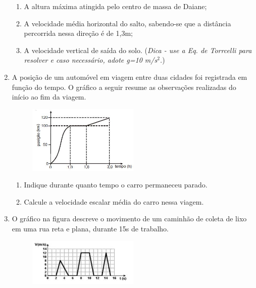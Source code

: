 \documentclass[12pt,letterpaper,fleqn]{article}
\begin{document}
\begin{enumerate}
    \begin{enumerate}
        \item A altura máxima atingida pelo centro de massa de Daiane;
        \item A velocidade média horizontal do salto, sabendo-se que a distância percorrida nessa direção é de 1,3m;
        \item A velocidade vertical de saída do solo. (\textit{Dica - use a Eq. de Torrcelli para resolver e caso necessário, adote g=10 m/s$^2$.})
    \end{enumerate}
    
    \item A posição de um automóvel em viagem entre duas cidades foi registrada em função do tempo. O gráfico a seguir resume as observações realizadas do início ao fim da viagem.
    
    \begin{figure}[H]
        \centering
        \includegraphics[width=0.5\textwidth]{unnamed.jpg}
        \label{fig:ex_6}
    \end{figure}
    
    \begin{enumerate}
        \item Indique durante quanto tempo o carro permaneceu parado.
        \item Calcule a velocidade escalar média do carro nessa viagem.
    \end{enumerate}
    
    \item O gráfico na figura descreve o movimento de um caminhão de coleta de lixo em uma rua reta e plana, durante 15s de trabalho.
    
    \begin{figure}[H]
        \centering
        \includegraphics[width=0.5\textwidth]{ex_7.jpg}
        \label{fig:ex_7}
    \end{figure}
    

\end{enumerate}
\end{document}
